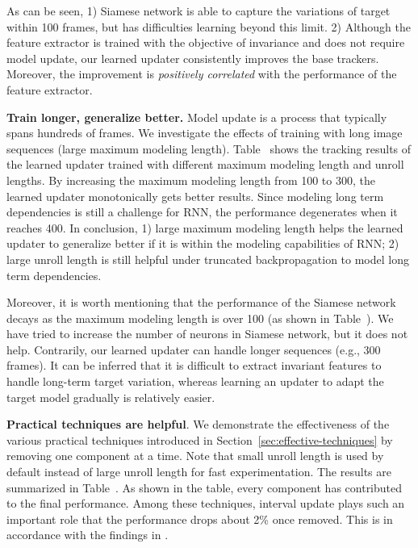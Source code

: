 \documentclass[journal]{IEEEtran}
\begin{document}
As can be seen, 1) Siamese network is able to capture the variations of target within 100 frames, but has difficulties learning beyond this limit. 2) Although the feature extractor is trained with the objective of invariance and does not require model update, our learned updater consistently improves the base trackers. Moreover, the improvement is \emph{positively correlated} with the performance of the feature extractor.

\textbf{Train longer, generalize better.} Model update is a process that typically spans hundreds of frames. We investigate the effects of training with long image sequences (large maximum modeling length). Table~ shows the tracking results of the learned updater trained with different maximum modeling length and unroll lengths. By increasing the maximum modeling length from 100 to 300, the learned updater monotonically gets better results. Since modeling long term dependencies is still a challenge for RNN, the performance degenerates when it reaches 400. In conclusion, 1) large maximum modeling length helps the learned updater to generalize better if it is within the modeling capabilities of RNN; 2) large unroll length is still helpful under truncated backpropagation to model long term dependencies.

Moreover, it is worth mentioning that the performance of the Siamese network decays as the maximum modeling length is over 100 (as shown in Table~). We have tried to increase the number of neurons in Siamese network, but it does not help. Contrarily, our learned updater can handle longer sequences (e.g., 300 frames). It can be inferred that it is difficult to extract invariant features to handle long-term target variation, whereas learning an updater to adapt the target model gradually is relatively easier.

\textbf{Practical techniques are helpful}. We demonstrate the effectiveness of the various practical techniques introduced in Section~\ref{sec:effective-techniques} by removing one component at a time. Note that small unroll length is used by default instead of large unroll length for fast experimentation. The results are summarized in Table~. As shown in the table, every component has contributed to the final performance. Among these techniques, interval update plays such an important role that the performance drops about 2\% once removed. This is in accordance with the findings in \cite{Danelljan2016ECOEC}.
\end{document}
